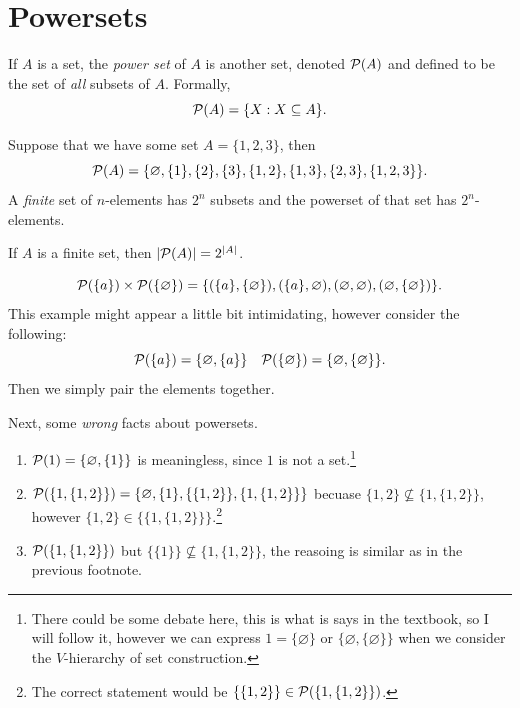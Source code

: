 \section{Powersets}

\begin{defn}
    If $A$ is a set, the \emph{power set} of $A$ is another set, denoted $\mathcal{P}(A)$ and defined to be the set of \emph{all} subsets of $A$. Formally, 
    $$
    \mathcal{P}(A)=\{ X:X\subseteq A \}.
    $$
\end{defn}

Suppose that we have some set $A=\{ 1,2,3 \}$, then 
$$\mathcal{P}(A)=\{ \varnothing,\{ 1 \},\{ 2 \},\{ 3 \}, \{ 1,2 \},\{ 1,3 \},\{ 2,3 \},\{ 1,2,3 \} \}.$$ 
A \emph{finite} set of $n$-elements has $2^n$ subsets and the powerset of that set has $2^n$-elements. 

\begin{fact}
    If $A$ is a finite set, then $\lvert \mathcal{P}(A) \rvert=2^{\lvert A \rvert}$.
\end{fact}

\begin{example}
    $$
    \mathcal{P}(\{ a \})\times\mathcal{P}(\{ \varnothing \})=\{ (\{ a \},\{ \varnothing \}), (\{ a \},\varnothing), (\varnothing,\varnothing),(\varnothing, \{ \varnothing \}) \}.
    $$
    This example might appear a little bit intimidating, however consider the following: 
    $$
    \mathcal{P}(\{ a \})=\{ \varnothing,\{ a \} \} \quad \mathcal{P}(\{ \varnothing \})=\{ \varnothing,\{ \varnothing \} \}.
    $$
    Then we simply pair the elements together. 
\end{example}

Next, some \emph{wrong} facts about powersets. 
\begin{enumerate}
    \item $\mathcal{P}(1)=\{ \varnothing,\{ 1 \} \}$ is meaningless, since $1$ is not a set.\footnote{There could be some debate here, this is what is says in the textbook, so I will follow it, however we can express $1=\{ \varnothing \}$ or $\{ \varnothing, \{ \varnothing \} \}$ when we consider the $V$-hierarchy of set construction.}
    \item $\mathcal{P}(\{ 1,\{ 1,2 \} \})=\{ \varnothing,\{ 1 \},\{ \{ 1,2 \} \},\{ 1,\{ 1,2 \} \} \}$ becuase $\{ 1,2 \}\not\subseteq \{ 1,\{ 1,2 \} \}$, however $\{ 1,2 \}\in\{\{ 1,\{ 1,2 \}\}\}$.\footnote{The correct statement would be $\{ \{ 1,2 \} \}\in\mathcal{P}(\{ 1,\{ 1,2 \} \})$.}
    \item $\mathcal{P}(\{ 1,\{ 1,2 \} \})$ but $\{ \{ 1 \} \}\not\subseteq \{ 1,\{ 1,2 \} \}$, the reasoing is similar as in the previous footnote. 
\end{enumerate}

